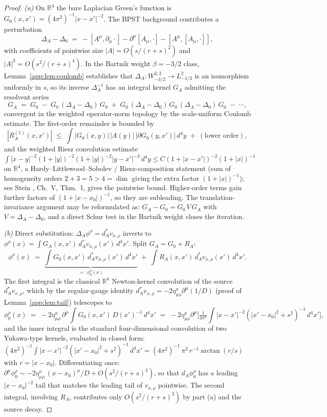 \documentclass[11pt,letterpaper]{article}
\theoremstyle{definition}
\newcommand{\bbR}{\mathbb{R}}
\newcommand{\Lap}{\Delta}
\begin{document}
\begin{proof}
\emph{(a)} On $\bbR^4$ the bare Laplacian Green's function is $G_0(x,x') = (4\pi^2)^{-1}|x-x'|^{-2}$. The BPST background contributes a perturbation
\[
\Lap_A - \Lap_0 \;=\; -[A^\mu, \partial_\mu \cdot] - \partial^\mu[A_\mu, \cdot] - [A^\mu, [A_\mu, \cdot]],
\]
with coefficients of pointwise size $|A| = O(s/(r+s)^{2})$ and $|A|^2 = O(s^2/(r+s)^4)$. In the Bartnik weight $\beta = -3/2$ class, Lemma~\ref{app:lem:coulomb} establishes that $\Lap_A: W^{2,2}_{-3/2}\to L^2_{-1/2}$ is an isomorphism uniformly in $s$, so its inverse $\Lap_A^{-1}$ has an integral kernel $G_A$ admitting the resolvent series
\[
G_A \;=\; G_0 \;-\; G_0\,(\Lap_A - \Lap_0)\,G_0 \;+\; G_0\,(\Lap_A - \Lap_0)\,G_0\,(\Lap_A - \Lap_0)\,G_0 \;-\; \cdots,
\]
convergent in the weighted operator-norm topology by the scale-uniform Coulomb estimate. The first-order remainder is bounded by
\[
|R_A^{(1)}(x,x')| \;\le\; \int |G_0(x,y)|\,|A(y)|\,|\partial G_0(y,x')|\,d^4y \;+\; (\text{lower order}),
\]
and the weighted Riesz convolution estimate $\int |x-y|^{-2}(1+|y|)^{-2}(1+|y|)^{-2}|y-x'|^{-3}\,d^4y \le C(1+|x-x'|)^{-2}(1+|x|)^{-1}$ on $\bbR^4$, a Hardy--Littlewood--Sobolev / Riesz-composition statement (sum of homogeneity orders $2+3 = 5 > 4 = \dim$ giving the extra factor $(1+|x|)^{-1}$); see Stein \cite{Stein1970}, Ch.~V, Thm.~1, gives the pointwise bound. Higher-order terms gain further factors of $(1+|x-x_0|)^{-1}$, so they are subleading. The translation-invariance argument may be reformulated as: $G_A - G_0 = G_0\,V\,G_A$ with $V = \Lap_A - \Lap_0$, and a direct Schur test in the Bartnik weight closes the iteration.

\emph{(b)} Direct substitution: $\Lap_A \phi^\rho = d_A^* v_{x,\rho}$ inverts to $\phi^\rho(x) = \int G_A(x,x')\,d_A^*v_{x,\rho}(x')\,d^4x'$. Split $G_A = G_0 + R_A$:
\[
\phi^\rho(x) \;=\; \underbrace{\int G_0(x,x')\,d_A^*v_{x,\rho}(x')\,d^4x'}_{=: \phi_0^\rho(x)} \;+\; \int R_A(x,x')\,d_A^*v_{x,\rho}(x')\,d^4x'.
\]
The first integral is the classical $\bbR^4$ Newton-kernel convolution of the source $d_A^* v_{x,\rho}$, which by the regular-gauge identity $d_A^* v_{x,\rho} = -2\eta^a_{\mu\rho}\partial^\mu(1/D)$ (proof of Lemma~\ref{app:lem:tail}) telescopes to
\[
\phi_0^\rho(x) \;=\; -2\eta^a_{\mu\rho}\,\partial^\mu \int G_0(x,x')\,D(x')^{-1}\,d^4x' \;=\; -2\eta^a_{\mu\rho}\partial^\mu\bigl[\tfrac{1}{4\pi^2}\!\int |x-x'|^{-2}(|x'-x_0|^2+s^2)^{-1}\,d^4x'\bigr],
\]
and the inner integral is the standard four-dimensional convolution of two Yukawa-type kernels, evaluated in closed form: $(4\pi^2)^{-1}\int |x-x'|^{-2}(|x'-x_0|^2+s^2)^{-1}\,d^4x' = (4\pi^2)^{-1}\,\pi^2\,r^{-1}\arctan(r/s)$ with $r = |x-x_0|$. Differentiating once: $\partial^\mu \phi_0^\rho \sim -2\eta^a_{\mu\rho}\,(x-x_0)^\mu/D + O(s^2/(r+s)^3)$, so that $d_A\phi_0^\rho$ has a leading $|x-x_0|^{-2}$ tail that matches the leading tail of $v_{x,\rho}$ pointwise. The second integral, involving $R_A$, contributes only $O(s^2/(r+s)^3)$ by part (a) and the source decay.


\end{proof}
\end{document}
